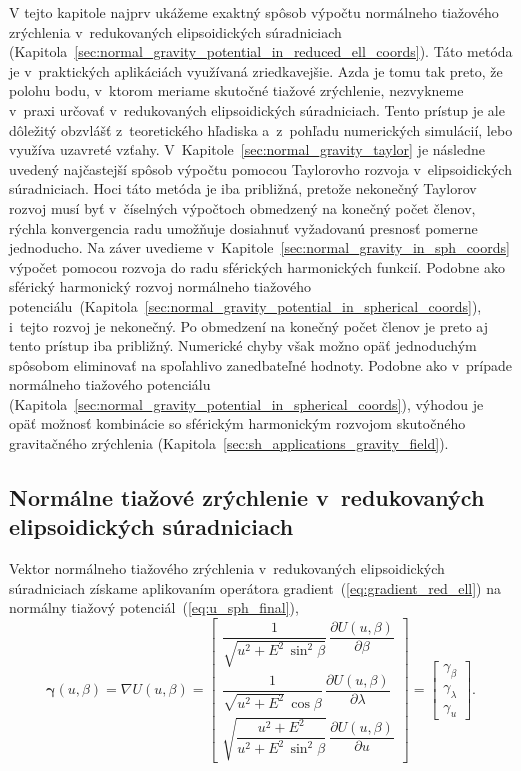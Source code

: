 \documentclass[a4paper, 12pt]{book}
\begin{document}
V tejto kapitole najprv ukážeme exaktný spôsob výpočtu normálneho tiažového 
zrýchlenia v~redukovaných elipsoidických súradniciach 
(Kapitola~\ref{sec:normal_gravity_potential_in_reduced_ell_coords}).  Táto 
metóda je v~praktických aplikáciách využívaná zriedkavejšie.  Azda je tomu tak 
preto, že polohu bodu, v~ktorom meriame skutočné tiažové zrýchlenie, nezvykneme 
v~praxi určovať v~redukovaných elipsoidických súradniciach.  Tento prístup je 
ale dôležitý obzvlášť z~teoretického hľadiska a~z~pohľadu numerických 
simulácií, lebo využíva uzavreté vzťahy.  
V~Kapitole~\ref{sec:normal_gravity_taylor} je následne uvedený najčastejší 
spôsob výpočtu pomocou Taylorovho rozvoja v~elipsoidických súradniciach.  Hoci 
táto metóda je iba približná, pretože nekonečný Taylorov rozvoj musí byť 
v~číselných výpočtoch obmedzený na konečný počet členov, rýchla konvergencia 
radu umožňuje dosiahnuť vyžadovanú presnosť pomerne jednoducho.  Na záver 
uvedieme v~Kapitole~\ref{sec:normal_gravity_in_sph_coords} výpočet pomocou 
rozvoja do radu sférických harmonických funkcií.  Podobne ako sférický 
harmonický rozvoj normálneho tiažového 
potenciálu~(Kapitola~\ref{sec:normal_gravity_potential_in_spherical_coords}), 
i~tejto rozvoj je nekonečný.  Po obmedzení na konečný počet členov je preto aj
tento prístup iba približný.  Numerické chyby však možno opäť jednoduchým 
spôsobom eliminovať na spoľahlivo zanedbateľné hodnoty.  Podobne ako v~prípade 
normálneho tiažového potenciálu 
(Kapitola~\ref{sec:normal_gravity_potential_in_spherical_coords}), výhodou je 
opäť možnosť kombinácie so sférickým harmonickým rozvojom skutočného 
gravitačného zrýchlenia (Kapitola~\ref{sec:sh_applications_gravity_field}).



\subsection{Normálne tiažové zrýchlenie v~redukovaných elipsoidických 
súradniciach}
\label{sec:normal_gravity_in_reduced_ell_coords}

Vektor normálneho tiažového zrýchlenia v~redukovaných elipsoidických 
súradniciach získame aplikovaním operátora gradient~(\ref{eq:gradient_red_ell}) 
na normálny tiažový potenciál~(\ref{eq:u_sph_final}),
%
\begin{equation}
\label{eq:gamma_vec_general}
\boldsymbol \gamma(u, \beta) = \nabla U(u, \beta) =
%
\begin{bmatrix}
\dfrac{1}{\sqrt{u^2 + E^2 \, \sin^2\beta}} \, \dfrac{\partial U(u, 
\beta)}{\partial \beta}\\[2ex]
\dfrac{1}{\sqrt{u^2 + E^2} \, \cos\beta} \, \dfrac{\partial U(u, 
\beta)}{\partial \lambda}\\[2ex]
\sqrt{\dfrac{u^2 + E^2}{u^2 + E^2 \, \sin^2\beta}} \, \dfrac{\partial U(u, 
\beta)}{\partial u}
\end{bmatrix}
%
=
%
\begin{bmatrix}
\gamma_\beta\\
\gamma_\lambda\\
\gamma_u
\end{bmatrix}
%
{.}
\end{equation}
\end{document}
